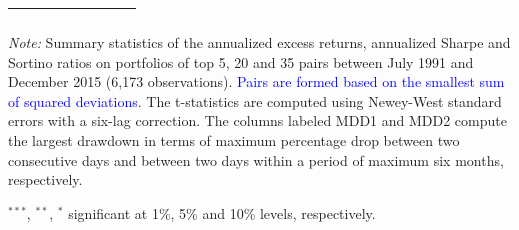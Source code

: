 \documentclass[pdf,9pt,xcolor=dvipsnames,hide notes]{beamer}
\begin{document}
\begin{frame}
\begin{threeparttable}[H]
\begin{tabularx}{\textwidth}{@{\extracolsep{\fill}}llllllll@{}}
			\multicolumn{1}{r}{} & \multicolumn{1}{r}{} & \multicolumn{1}{r}{} & \multicolumn{1}{r}{} & \multicolumn{1}{r}{} & \multicolumn{1}{r}{} & \multicolumn{1}{r}{} & \multicolumn{1}{r}{} \\
			\bottomrule
		\end{tabularx}%
		\begin{tablenotes}
			\item \textit{Note:} \tiny Summary statistics of the annualized excess returns, annualized Sharpe and Sortino ratios on portfolios of top 5, 20 and 35 pairs between July 1991 and December 2015 (6,173 observations).  \textcolor{blue} {Pairs are formed based on the smallest sum of squared deviations}. The t-statistics are computed using Newey-West standard errors with a six-lag correction. The columns labeled MDD1 and MDD2 compute the largest drawdown in terms of maximum percentage drop between two consecutive days and between two days within a period of maximum six months, respectively.
			\item \scriptsize $^{\ast\ast\ast}$, $^{\ast\ast}$, $^{\ast}$  significant at 1\%, 5\% and 10\% levels, respectively.
		\end{tablenotes}
		\label{tab:table103}%
	\end{threeparttable}%
	
	
\end{frame}
\end{document}
